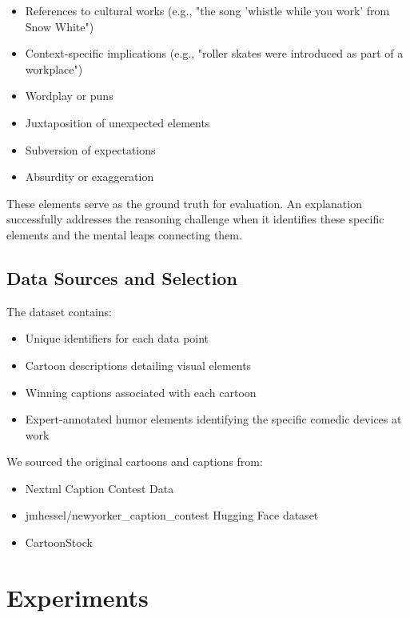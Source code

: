 \documentclass[twocolumn]{article}
\begin{document}
\begin{itemize}
    \item References to cultural works (e.g., "the song 'whistle while you work' from Snow White")
    \item Context-specific implications (e.g., "roller skates were introduced as part of a workplace")
    \item Wordplay or puns
    \item Juxtaposition of unexpected elements
    \item Subversion of expectations
    \item Absurdity or exaggeration
\end{itemize}

These elements serve as the ground truth for evaluation. An explanation successfully addresses the reasoning challenge when it identifies these specific elements and the mental leaps connecting them.

\subsection{Data Sources and Selection}

The dataset contains:
\begin{itemize}
    \item Unique identifiers for each data point
    \item Cartoon descriptions detailing visual elements
    \item Winning captions associated with each cartoon
    \item Expert-annotated humor elements identifying the specific comedic devices at work
\end{itemize}

We sourced the original cartoons and captions from:
\begin{itemize}
    \item Nextml Caption Contest Data
    \item jmhessel/newyorker\_caption\_contest Hugging Face dataset
    \item CartoonStock
\end{itemize}


\section{Experiments}
\end{document}
